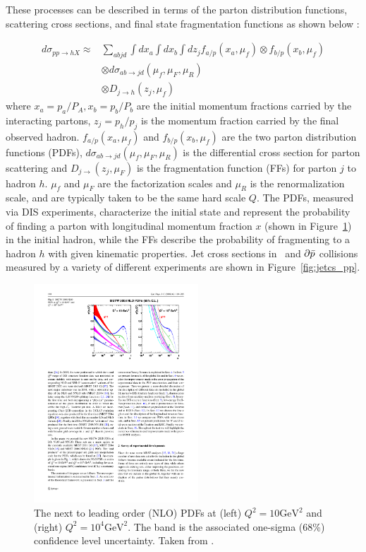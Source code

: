 These processes can be described in terms of the parton distribution functions, scattering cross sections, and final state fragmentation functions as shown below \cite{Qin:2015srf}:

\begin{align}
\label{eq:hadronCS}
d \sigma_{pp \rightarrow hX} \approx & \sum_{abjd} \int dx_a \int dx_b \int dz_j f_{a/p} (x_a, \mu_f) \otimes f_{b/p} (x_b, \mu_f) \\
& \otimes d\sigma_{ab\rightarrow jd} (\mu_f, \mu_F, \mu_R)  \nonumber \\
& \otimes D_{j \rightarrow h} (z_j, \mu_f) \nonumber
\end{align}
where $x_a = p_a/P_A, x_b = p_b / P_b$ are the initial momentum fractions carried by the interacting partons, $z_j = p_h / p_j$ is the momentum fraction carried by the final observed hadron.
$f_{a/p} (x_a, \mu_f)$ and $f_{b/p} (x_b, \mu_f)$ are the two parton distribution functions (PDFs), $d\sigma_{ab\rightarrow jd} (\mu_f, \mu_F, \mu_R)$ is the differential cross section for parton scattering and $D_{j\rightarrow }(z_j,\mu_F)$ is the fragmentation function (FFs) for parton $j$ to hadron $h$.
$\mu_f$ and $\mu_F$ are the factorization scales and $\mu_R$ is the renormalization scale, and are typically taken to be the same hard scale $Q$.
The PDFs, measured via DIS experiments, characterize the initial state and represent the probability of finding a parton with longitudinal momentum fraction $x$ (shown in Figure~\ref{fig:bjorkenX}) in the initial hadron, while the FFs describe the probability of fragmenting to a hadron $h$ with given kinematic properties.
Jet cross sections in \pp\ and $\partial \bar{p}$ collisions measured by a variety of different experiments are shown in Figure~\ref{fig:jetcs_pp}. 

\begin{figure}[htbp]
\begin{center}
\includegraphics[width=0.55\textwidth]{figures/theory/bjorkenX}
\caption{The next to leading order (NLO) PDFs at (left) $Q^2 = 10 \mathrm{GeV}^2$ and (right) $Q^2 = 10^4 \mathrm{GeV}^2$.
The band is the associated one-sigma (68\%) confidence level uncertainty.
Taken from \cite{Martin2009}.}
\label{fig:bjorkenX}
\end{center}
\end{figure}
 
